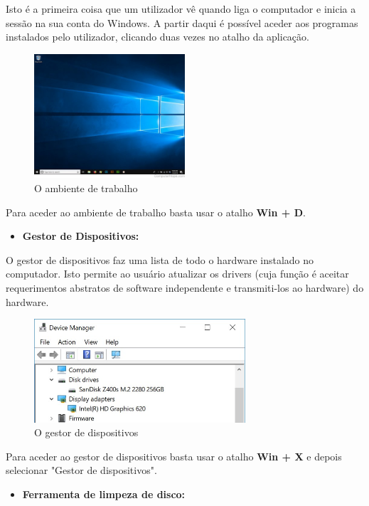 \documentclass{report}
\begin{document}
Isto é a primeira coisa que um utilizador vê quando liga o computador e inicia a sessão na sua conta do Windows. A partir daqui é possível aceder aos programas instalados pelo utilizador, clicando duas vezes no atalho da aplicação.

\begin{figure}[h!]
\includegraphics[width=0.5\textwidth]{desktop-win10.jpg}
\centering
\caption{O ambiente de trabalho}
\end{figure}

Para aceder ao ambiente de trabalho basta usar o atalho \textbf{Win + D}.

\begin{itemize}
    \item \textbf{Gestor de Dispositivos:}
\end{itemize}

O gestor de dispositivos faz uma lista de todo o hardware instalado no computador. Isto permite ao usuário atualizar os drivers (cuja função é aceitar requerimentos abstratos de software independente e transmiti-los ao hardware)  do hardware.

\begin{figure}[h!]
\includegraphics[width=0.7\textwidth]{device-manager.jpg}
\centering
\caption{O gestor de dispositivos}
\end{figure}

Para aceder ao gestor de dispositivos basta usar o atalho \textbf{Win + X} e depois selecionar "Gestor de dispositivos".

\begin{itemize}
    \item \textbf{Ferramenta de limpeza de disco:}
\end{itemize}
\end{document}
